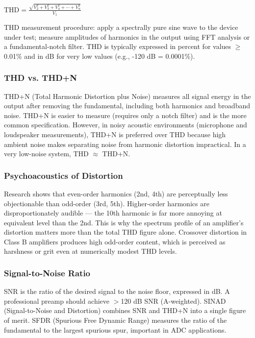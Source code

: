 \documentclass[11pt,letterpaper]{article}
\begin{document}
\begin{center}
$\text{THD} = \frac{\sqrt{V_2^2 + V_3^2 + V_4^2 + \cdots + V_n^2}}{V_1}$
\end{center}

THD measurement procedure: apply a spectrally pure sine wave to the device under test; measure amplitudes of harmonics in the output using FFT analysis or a fundamental-notch filter. THD is typically expressed in percent for values $\geq$0.01\% and in dB for very low values (e.g., -120 dB = 0.0001\%).

\subsubsection{THD vs. THD+N}

THD+N (Total Harmonic Distortion plus Noise) measures all signal energy in the output after removing the fundamental, including both harmonics and broadband noise. THD+N is easier to measure (requires only a notch filter) and is the more common specification. However, in noisy acoustic environments (microphone and loudspeaker measurements), THD+N is preferred over THD because high ambient noise makes separating noise from harmonic distortion impractical. In a very low-noise system, THD $\approx$ THD+N.

\subsubsection{Psychoacoustics of Distortion}

Research shows that even-order harmonics (2nd, 4th) are perceptually less objectionable than odd-order (3rd, 5th). Higher-order harmonics are disproportionately audible --- the 10th harmonic is far more annoying at equivalent level than the 2nd. This is why the spectrum profile of an amplifier's distortion matters more than the total THD figure alone. Crossover distortion in Class B amplifiers produces high odd-order content, which is perceived as harshness or grit even at numerically modest THD levels.

\subsubsection{Signal-to-Noise Ratio}

SNR is the ratio of the desired signal to the noise floor, expressed in dB. A professional preamp should achieve $>$120 dB SNR (A-weighted). SINAD (Signal-to-Noise and Distortion) combines SNR and THD+N into a single figure of merit. SFDR (Spurious Free Dynamic Range) measures the ratio of the fundamental to the largest spurious spur, important in ADC applications.
\end{document}
